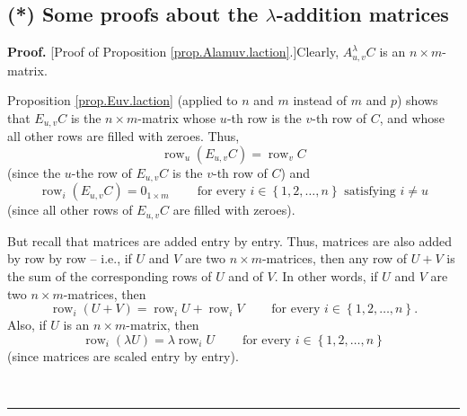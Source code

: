 \documentclass[numbers=enddot,12pt,final,onecolumn,notitlepage]{scrartcl}%
\theoremstyle{definition}
\newenvironment{proof}[1][Proof]{\noindent\textbf{#1.} }{\ \rule{0.5em}{0.5em}}
\begin{document}
\subsection{\label{sect.gauss.Alamuv.proofs}(*) Some proofs about the
$\lambda$-addition matrices}

\begin{proof}
[Proof of Proposition \ref{prop.Alamuv.laction}.]Clearly, $A_{u,v}^{\lambda}C$
is an $n\times m$-matrix.

Proposition \ref{prop.Euv.laction} (applied to $n$ and $m$ instead of $m$ and
$p$) shows that $E_{u,v}C$ is the $n\times m$-matrix whose $u$-th row is the
$v$-th row of $C$, and whose all other rows are filled with zeroes. Thus,%
\begin{equation}
\operatorname*{row}\nolimits_{u}\left(  E_{u,v}C\right)  =\operatorname*{row}%
\nolimits_{v}C \label{pf.prop.Alamuv.laction.1}%
\end{equation}
(since the $u$-the row of $E_{u,v}C$ is the $v$-th row of $C$) and%
\begin{equation}
\operatorname*{row}\nolimits_{i}\left(  E_{u,v}C\right)  =0_{1\times
m}\ \ \ \ \ \ \ \ \ \ \text{for every }i\in\left\{  1,2,\ldots,n\right\}
\text{ satisfying }i\neq u \label{pf.prop.Alamuv.laction.2}%
\end{equation}
(since all other rows of $E_{u,v}C$ are filled with zeroes).

But recall that matrices are added entry by entry. Thus, matrices are also
added by row by row -- i.e., if $U$ and $V$ are two $n\times m$-matrices, then
any row of $U+V$ is the sum of the corresponding rows of $U$ and of $V$. In
other words, if $U$ and $V$ are two $n\times m$-matrices, then%
\begin{equation}
\operatorname*{row}\nolimits_{i}\left(  U+V\right)  =\operatorname*{row}%
\nolimits_{i}U+\operatorname*{row}\nolimits_{i}V\ \ \ \ \ \ \ \ \ \ \text{for
every }i\in\left\{  1,2,\ldots,n\right\}  . \label{pf.prop.Alamuv.laction.5}%
\end{equation}
Also, if $U$ is an $n\times m$-matrix, then%
\begin{equation}
\operatorname*{row}\nolimits_{i}\left(  \lambda U\right)  =\lambda
\operatorname*{row}\nolimits_{i}U\ \ \ \ \ \ \ \ \ \ \text{for every }%
i\in\left\{  1,2,\ldots,n\right\}  \label{pf.prop.Alamuv.laction.6}%
\end{equation}
(since matrices are scaled entry by entry).


\end{proof}
\end{document}

